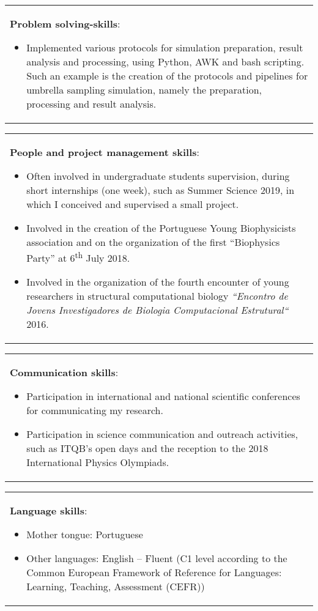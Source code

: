 \documentclass[a4paper,11pt]{article}
\begin{document}
\begin{center}
\begin{tabularx}{\linewidth}{X}
\textbf{Problem solving-skills$\colon$}
\begin{itemize}
\item Implemented various protocols  for simulation preparation, result analysis and processing, using Python, AWK and bash scripting. Such an example is the creation of the protocols and pipelines for umbrella sampling simulation, namely the preparation, processing and result analysis.
\end{itemize} 
\end{tabularx}


\begin{tabularx}{\linewidth}{X}
\textbf{People and project management skills$\colon$}
\begin{itemize}
\item Often involved in undergraduate students supervision, during short internships (one week), such as Summer Science 2019, in which I conceived and supervised a small project.
\item Involved in the creation of the Portuguese Young Biophysicists association and on the organization of the first “Biophysics Party” at 6\textsuperscript{th} July 2018.
\item Involved in the organization of the fourth encounter of young researchers in structural computational biology \textit{``Encontro de Jovens Investigadores de Biologia Computacional Estrutural``} 2016.
\end{itemize}
\end{tabularx}

\begin{tabularx}{\linewidth}{X}
\textbf{Communication skills$\colon$}
\begin{itemize}
\item Participation in international and national scientific conferences for communicating my research.
\item Participation in science communication and outreach activities, such as ITQB’s open days and the reception to the 2018 International Physics Olympiads.
\end{itemize}
\end{tabularx}



\begin{tabularx}{\linewidth}{X}
\textbf{Language skills$\colon$}
\begin{itemize}
\item Mother tongue: Portuguese
\item Other languages: English – Fluent (C1 level according to the Common European Framework of Reference for Languages: Learning, Teaching, Assessment (CEFR))
\end{itemize} \\
\end{tabularx}



\end{center}
\end{document}
